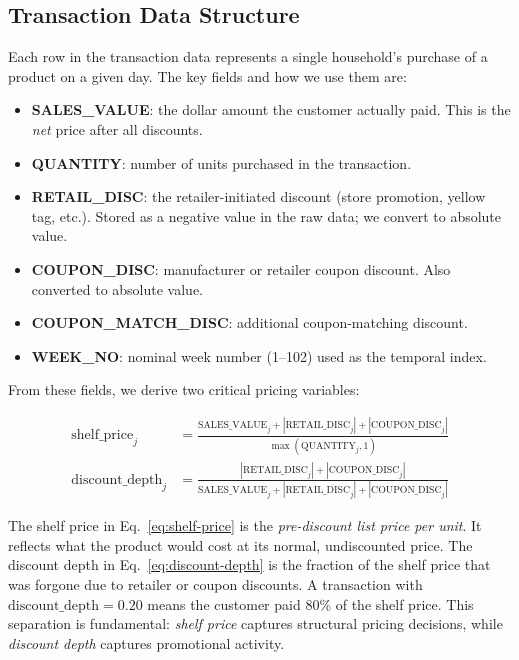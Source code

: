 \documentclass[12pt,a4paper]{article}
\begin{document}
\subsection{Transaction Data Structure}

Each row in the transaction data represents a single household's
purchase of a product on a given day. The key fields and how we use
them are:

\begin{itemize}[nosep]
\item \textbf{SALES\_VALUE}: the dollar amount the customer actually
paid. This is the \emph{net} price after all discounts.

\item \textbf{QUANTITY}: number of units purchased in the transaction.

\item \textbf{RETAIL\_DISC}: the retailer-initiated discount (store
promotion, yellow tag, etc.). Stored as a negative value in the raw
data; we convert to absolute value.

\item \textbf{COUPON\_DISC}: manufacturer or retailer coupon discount.
Also converted to absolute value.

\item \textbf{COUPON\_MATCH\_DISC}: additional coupon-matching
discount.

\item \textbf{WEEK\_NO}: nominal week number (1--102) used as the
temporal index.
\end{itemize}

From these fields, we derive two critical pricing variables:

\begin{align}
\text{shelf\_price}_j &= \frac{\text{SALES\_VALUE}_j +
|\text{RETAIL\_DISC}_j| + |\text{COUPON\_DISC}_j|}
{\max(\text{QUANTITY}_j, 1)}
\label{eq:shelf-price}
\\[4pt]
\text{discount\_depth}_j &= \frac{|\text{RETAIL\_DISC}_j| +
|\text{COUPON\_DISC}_j|}
{\text{SALES\_VALUE}_j + |\text{RETAIL\_DISC}_j| +
|\text{COUPON\_DISC}_j|}
\label{eq:discount-depth}
\end{align}

The shelf price in Eq.~\eqref{eq:shelf-price} is the
\emph{pre-discount list price per unit}. It reflects what the product
would cost at its normal, undiscounted price. The discount depth in
Eq.~\eqref{eq:discount-depth} is the fraction of the shelf price
that was forgone due to retailer or coupon discounts. A transaction
with $\text{discount\_depth} = 0.20$ means the customer paid 80\% of
the shelf price. This separation is fundamental: \emph{shelf price}
captures structural pricing decisions, while \emph{discount depth}
captures promotional activity.
\end{document}
